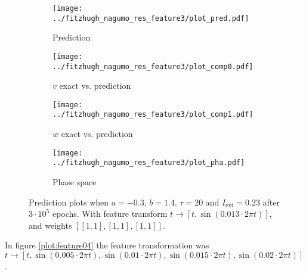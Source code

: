 \documentclass[a4paper]{article}
\begin{document}
\begin{figure}[H]
	\centering 
	\begin{subfigure}[b]{0.47\textwidth}
		\centering
		\texttt{[image: ../fitzhugh\_nagumo\_res\_feature3/plot\_pred.pdf]}
		\caption{Prediction}
		\label{fig:feature03a}
	\end{subfigure}
	\begin{subfigure}[b]{0.47\textwidth}
		\centering
		\texttt{[image: ../fitzhugh\_nagumo\_res\_feature3/plot\_comp0.pdf]}
		\caption{$v$ exact vs. prediction}
		\label{fig:feature03b}
	\end{subfigure}
	\begin{subfigure}[b]{0.47\textwidth}
		\centering
		\texttt{[image: ../fitzhugh\_nagumo\_res\_feature3/plot\_comp1.pdf]}
		\caption{$w$ exact vs. prediction}
		\label{fig:feature03c}
	\end{subfigure}
	\begin{subfigure}[b]{0.47\textwidth}
		\centering
		\texttt{[image: ../fitzhugh\_nagumo\_res\_feature3/plot\_pha.pdf]}
		\caption{Phase space}
		\label{fig:feature03d}
	\end{subfigure}
	\caption{Prediction plots when $a=-0.3$, $b=1.4$, $\tau=20$ and $ I_{\text{ext}}=0.23$ after $3\cdot10^5$ epochs. With feature transform $t \rightarrow \left[  t, \sin(0.013\cdot 2 \pi t) \right]$, and weights $\left[ \left[ 1, 1\right], \left[ 1, 1\right], \left[ 1, 1\right]\right]$.}
	\label{plot:feature03}
\end{figure}


In figure \ref{plot:feature04}  the feature transformation was $t \rightarrow \left[  t, \sin(0.005\cdot 2 \pi t), \sin(0.01\cdot 2 \pi t), \sin(0.015\cdot 2 \pi t), \sin(0.02\cdot 2 \pi t) \right]$. 
\end{document}
